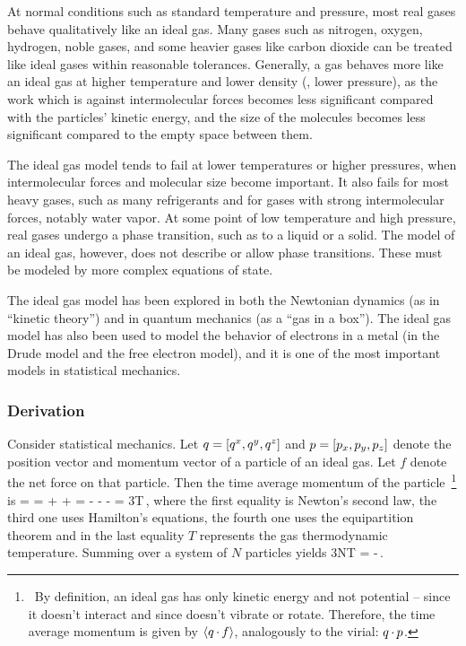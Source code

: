 At normal conditions such as standard temperature and pressure, most real gases behave qualitatively like an ideal gas. Many gases such as nitrogen, oxygen, hydrogen, noble gases, and some heavier gases like carbon dioxide can be treated like ideal gases within reasonable tolerances. Generally, a gas behaves more like an ideal gas at higher temperature and lower density (\ie, lower pressure), as the work which is against intermolecular forces becomes less significant compared with the particles' kinetic energy, and the size of the molecules becomes less significant compared to the empty space between them.

The ideal gas model tends to fail at lower temperatures or higher pressures, when intermolecular forces and molecular size become important. It also fails for most heavy gases, such as many refrigerants and for gases with strong intermolecular forces, notably water vapor. At some point of low temperature and high pressure, real gases undergo a phase transition, such as to a liquid or a solid. The model of an ideal gas, however, does not describe or allow phase transitions. These must be modeled by more complex equations of state.

The ideal gas model has been explored in both the Newtonian dynamics (as in ``kinetic theory'') and in quantum mechanics (as a ``gas in a box''). The ideal gas model has also been used to model the behavior of electrons in a metal (in the Drude model and the free electron model), and it is one of the most important models in statistical mechanics.


\subsubsection{Derivation}
Consider statistical mechanics. Let $q = \left[{{q}^{x}, {q}^{y}, {q}^{z}}\right]$ and $p = \left[{{p}_{x}, {p}_{y}, {p}_{z}}\right]$ denote the position vector and momentum vector of a particle of an ideal gas. Let $f$ denote the net force on that particle. Then the time average momentum of the particle~\footnote{~By definition, an ideal gas has only kinetic energy and not potential -- since it doesn't interact and since doesn't vibrate or rotate. Therefore, the time average momentum is given by $\left\langle{q\operatorname{\cdot}f}\right\rangle$, analogously to the virial: $q\operatorname{\cdot} p$.} is
\beq
{} = \avg{\gpvec\iprod\dt\lmom}
                     =  +  + 
                     = - 
                       - 
                       -
                     = 3\boltz T\,,
\eeq
where the first equality is Newton's second law, the third one uses Hamilton's equations, the fourth one uses the equipartition theorem and in the last equality $T$ represents the gas thermodynamic temperature. Summing over a system of $N$ particles yields
\beq
3N\boltz T = -\,.
\eeq

